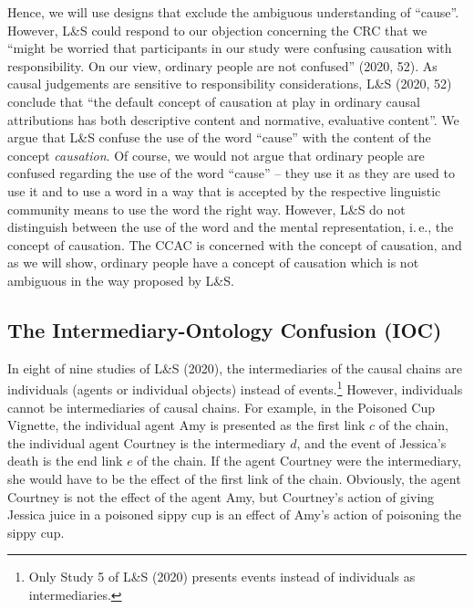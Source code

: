 \documentclass[egregdoesnotlikesansseriftitles,12pt]{scrartcl}
\begin{document}
Hence, we will use designs that exclude the ambiguous understanding of ``cause''. However, L\&S could respond to our objection concerning the CRC that we ``might be worried that participants in our study were confusing causation with responsibility. On our view, ordinary people are not confused'' (2020, 52). As causal judgements are sensitive to responsibility considerations, L\&S (2020, 52) conclude that ``the default concept of causation at play in ordinary causal attributions has both descriptive content and normative, evaluative content''. We argue that L\&S confuse the use of the word ``cause'' with the content of the concept \textit{causation}. Of course, we would not argue that ordinary people are confused regarding the use of the word ``cause'' -- they use it as they are used to use it and to use a word in a way that is accepted by the respective linguistic community means to use the word the right way. However, L\&S do not distinguish between the use of the word and the mental representation, i.\,e., the concept of causation. The CCAC is concerned with the concept of causation, and as we will show, ordinary people have a concept of causation which is not ambiguous in the way proposed by L\&S.

\subsection{The Intermediary-Ontology Confusion (IOC)}\label{sec:ioc}
In eight of nine studies of L\&S (2020), the intermediaries of the causal chains are individuals (agents or individual objects) instead of events.\footnote{Only Study 5 of L\&S (2020) presents events instead of individuals as intermediaries.} However, individuals cannot be intermediaries of causal chains. For example, in the Poisoned Cup Vignette, the individual agent Amy is presented as the first link $c$ of the chain, the individual agent Courtney is the intermediary $d$, and the event of Jessica's death is the end link $e$ of the chain. If the agent Courtney were the intermediary, she would have to be the effect of the first link of the chain. Obviously, the agent Courtney is not the effect of the agent Amy, but Courtney's action of giving Jessica juice in a poisoned sippy cup is an effect of Amy's action of poisoning the sippy cup.
\end{document}
